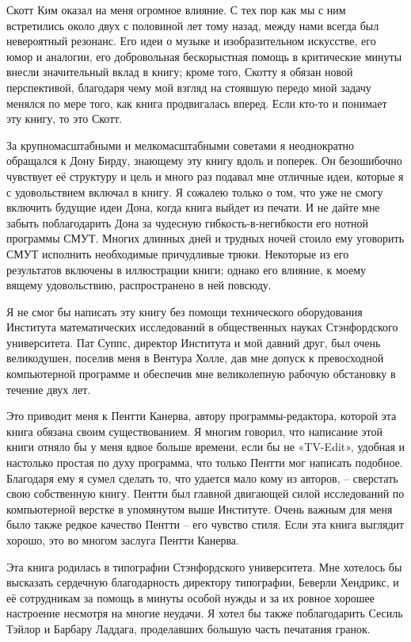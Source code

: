 \documentclass[../main.tex]{subfiles}
\begin{document}
Скотт Ким оказал на меня огромное влияние. С тех пор как мы с ним встретились около двух с половиной лет тому назад, между нами всегда был невероятный резонанс. Его идеи о музыке и изобразительном искусстве, его юмор и аналогии, его добровольная бескорыстная помощь в критические минуты внесли значительный вклад в книгу; кроме того, Скотту я обязан новой перспективой, благодаря чему мой взгляд на стоявшую передо мной задачу менялся по мере того, как книга продвигалась вперед. Если кто-то и понимает эту книгу, то это Скотт.

За крупномасштабными и мелкомасштабными советами я неоднократно обращался к Дону Бирду, знающему эту книгу вдоль и поперек. Он безошибочно чувствует её структуру и цель и много раз подавал мне отличные идеи, которые я с удовольствием включал в книгу. Я сожалею только о том, что уже не смогу включить будущие идеи Дона, когда книга выйдет из печати. И не дайте мне забыть поблагодарить Дона за чудесную гибкость-в-негибкости его нотной программы СМУТ\@. Многих длинных дней и трудных ночей стоило ему уговорить СМУТ исполнить необходимые причудливые трюки. Некоторые из его результатов включены в иллюстрации книги; однако его влияние, к моему вящему удовольствию, распространено в ней повсюду.

Я не смог бы написать эту книгу без помощи технического оборудования Института математических исследований в общественных науках Стэнфордского университета. Пат Суппс, директор Института и мой давний друг, был очень великодушен, поселив меня в Вентура Холле, дав мне допуск к превосходной компьютерной программе и обеспечив мне великолепную рабочую обстановку в течение двух лет.

Это приводит меня к Пентти Канерва, автору программы-редактора, которой эта книга обязана своим существованием. Я многим говорил, что написание этой книги отняло бы у меня вдвое больше времени, если бы не «TV-Edit», удобная и настолько простая по духу программа, что только Пентти мог написать подобное. Благодаря ему я сумел сделать то, что удается мало кому из авторов, \--- сверстать свою собственную книгу. Пентти был главной двигающей силой исследований по компьютерной верстке в упомянутом выше Институте. Очень важным для меня было также редкое качество Пентти \--- его чувство стиля. Если эта книга выглядит хорошо, это во многом заслуга Пентти Канерва.

Эта книга родилась в типографии Стэнфордского университета. Мне хотелось бы высказать сердечную благодарность директору типографии, Беверли Хендрикс, и её сотрудникам за помощь в минуты особой нужды и за их ровное хорошее настроение несмотря на многие неудачи. Я хотел бы также поблагодарить Сесиль Тэйлор и Барбару Ладдага, проделавших большую часть печатания гранок.
\end{document}
